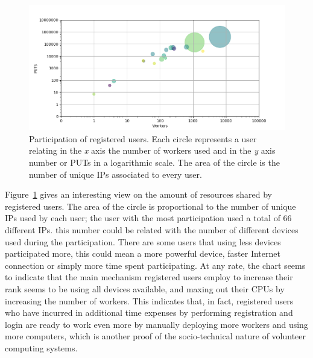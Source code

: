 \documentclass{llncs}
\begin{document}
%
\begin{figure}[htb]
    \centering
        \includegraphics[width=5.3in]{img/workers_put_ip.png}
    \caption{ Participation of registered users. Each circle represents a user relating
        in the \emph{x} axis the number of workers used and in the \emph{y} axis
        number or PUTs in a logarithmic scale. The area of the circle is the number
        of unique IPs associated to every user.
    }
    \label{fig:worker-put-ips}
\end{figure}
%
Figure~\ref{fig:worker-put-ips} gives an interesting view on the amount of
resources shared by registered users. The area of the circle is proportional
to the number of unique IPs used by each user; the user with the most participation
used a total of 66 different IPs. this number could be related with the number
of different devices used during the participation. There are some users that using less
devices participated more, this could mean a more powerful device, faster
Internet connection or simply more time spent participating. At any
rate, the chart seems to indicate that the main mechanism registered
users employ to increase their rank seems to be using all devices
available, and maxing out their CPUs by increasing the number of
workers. This indicates that, in fact, registered users who have
incurred in additional time expenses by performing registration and
login are ready to work even more by manually deploying more workers
and using more computers, which is another proof of the
socio-technical nature of volunteer computing systems.
\end{document}
